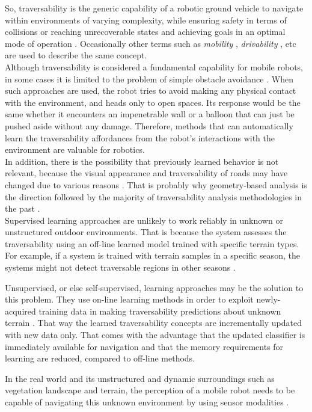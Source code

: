 \documentclass[12pt,a4paper,table,dvipsnames,tikz]{report}
\newcommand{\term}{\textit}
\begin{document}
	So, traversability is the generic capability of a robotic ground 
	vehicle to navigate within environments of varying complexity, while ensuring 
	safety in terms of collisions or reaching unrecoverable states and achieving 
	goals in an optimal mode of operation \citep{Papadakis}. Occasionally other 
	terms such as \term{mobility} \citep{Lalonde}, \term{drivability} \citep{Droeschel}, 
	etc are used to describe the same concept.
	\\
	
	Although traversability is considered a fundamental capability for mobile 
	robots, in some cases it is limited to the problem of simple obstacle avoidance 
	\citep{Ugur}. When such approaches are used, the robot tries to avoid making any 
	physical contact with the environment, and heads only to open spaces. Its 
	response would be the same whether it encounters an impenetrable wall or a 
	balloon that can just be pushed aside without any damage. Therefore, methods 
	that can automatically learn the traversability affordances from the 
	robot’s interactions with the environment are valuable for robotics.
	\\
		
	In addition, there is the possibility that previously learned behavior is not 
	relevant, because the visual appearance and traversability of roads may 
	have changed due to various reasons \citep{Wigness}. That is probably why 
	geometry-based analysis is the direction followed by the majority of 
	traversability analysis methodologies in the past \citep{Papadakis}.
	\\
	
	Supervised learning approaches are unlikely to work reliably in unknown or 
	unstructured outdoor environments. That is because the system assesses the 
	traversability using an off-line learned model trained with specific 
	terrain types. For example, if a system is trained with terrain samples in a 
	specific season, the systems might not detect traversable regions in other 
	seasons \citep{Lee}.
	\par
	Unsupervised, or else self-supervised, learning approaches may be the solution 
	to this problem. They use on-line learning methods in order to exploit newly-
	acquired training data in making traversability predictions about unknown 
	terrain \citep{Kim}. That way the learned traversability concepts are 
	incrementally updated with new data only. That comes with the advantage that the 
	updated classifier is immediately available for navigation and that the memory 
	requirements for learning are reduced, compared to off-line methods.
	\par
	In the real world and its unstructured and dynamic surroundings such as vegetation 
	landscape and terrain, the perception of a mobile robot needs to be capable of 
	navigating this unknown environment by using sensor modalities \citep{Shabbir}.
	\\
	
\end{document}
